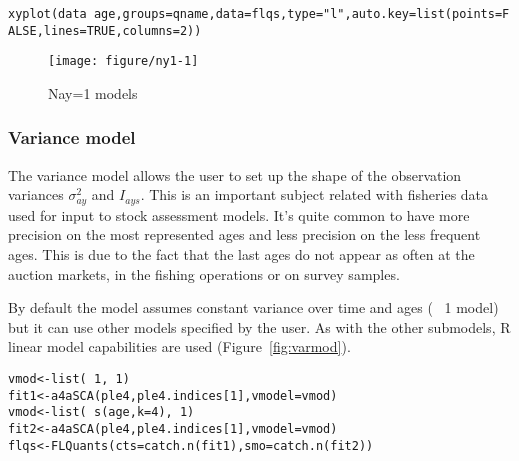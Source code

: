 \documentclass[a4paper,english,10pt]{article}\usepackage[]{graphicx}\usepackage[]{color}
\makeatletter
\def\maxwidth{ %
  \ifdim\Gin@nat@width>\linewidth
    \linewidth
  \else
    \Gin@nat@width
  \fi
}
\newcommand{\hlnum}[1]{\textcolor[rgb]{0.2,0.2,0.2}{#1}}%
\newcommand{\hlstr}[1]{\textcolor[rgb]{0.2,0.2,0.2}{#1}}%
\newcommand{\hlopt}[1]{\textcolor[rgb]{0.2,0.2,0.2}{#1}}%
\newcommand{\hlstd}[1]{\textcolor[rgb]{0,0,0}{#1}}%
\newcommand{\hlkwb}[1]{\textcolor[rgb]{0.361,0.506,0.596}{#1}}%
\newcommand{\hlkwc}[1]{\textcolor[rgb]{0.361,0.506,0.596}{#1}}%
\newcommand{\hlkwd}[1]{\textcolor[rgb]{0.361,0.506,0.596}{#1}}%
\newenvironment{kframe}{%
 \def\at@end@of@kframe{}%
 \ifinner\ifhmode%
  \def\at@end@of@kframe{\end{minipage}}%
  \begin{minipage}{\columnwidth}%
 \fi\fi%
 \def\FrameCommand##1{\hskip\@totalleftmargin \hskip-\fboxsep
 \colorbox{shadecolor}{##1}\hskip-\fboxsep
     \hskip-\linewidth \hskip-\@totalleftmargin \hskip\columnwidth}%
 \MakeFramed {\advance\hsize-\width
   \@totalleftmargin\z@ \linewidth\hsize
   \@setminipage}}%
 {\par\unskip\endMakeFramed%
 \at@end@of@kframe}
\newenvironment{knitrout}{}{} %
\makeatother
\begin{document}
\begin{knitrout}
\color{fgcolor}\begin{kframe}
\begin{alltt}
\hlkwd{xyplot}\hlstd{(data}\hlopt{~}\hlstd{age,} \hlkwc{groups}\hlstd{=qname,} \hlkwc{data}\hlstd{=flqs,} \hlkwc{type}\hlstd{=}\hlstr{"l"}\hlstd{,} \hlkwc{auto.key}\hlstd{=}\hlkwd{list}\hlstd{(}\hlkwc{points}\hlstd{=}\hlnum{FALSE}\hlstd{,} \hlkwc{lines}\hlstd{=}\hlnum{TRUE}\hlstd{,} \hlkwc{columns}\hlstd{=}\hlnum{2}\hlstd{))}
\end{alltt}
\end{kframe}\begin{figure}[H]

{\centering \texttt{[image: figure/ny1-1]} 

}

\caption[Nay=1 models]{Nay=1 models\label{fig:ny1}}
\end{figure}


\end{knitrout}

\subsubsection{Variance model}

The variance model allows the user to set up the shape of the observation variances $\sigma^2_{ay}$ and $I_{ays}$. This is an important subject related with fisheries data used for input to stock assessment models. It's quite common to have more precision on the most represented ages and less precision on the less frequent ages. This is due to the fact that the last ages do not appear as often at the auction markets, in the fishing operations or on survey samples.

By default the model assumes constant variance over time and ages (~ 1 model) but it can use other models specified by the user. As with the other submodels, R linear model capabilities are used (Figure~\ref{fig:varmod}).

\begin{knitrout}
\color{fgcolor}\begin{kframe}
\begin{alltt}
\hlstd{vmod} \hlkwb{<-} \hlkwd{list}\hlstd{(}\hlopt{~}\hlnum{1}\hlstd{,} \hlopt{~}\hlnum{1}\hlstd{)}
\hlstd{fit1} \hlkwb{<-} \hlkwd{a4aSCA}\hlstd{(ple4, ple4.indices[}\hlnum{1}\hlstd{],} \hlkwc{vmodel}\hlstd{=vmod)}
\hlstd{vmod} \hlkwb{<-} \hlkwd{list}\hlstd{(}\hlopt{~} \hlkwd{s}\hlstd{(age,} \hlkwc{k}\hlstd{=}\hlnum{4}\hlstd{),} \hlopt{~}\hlnum{1}\hlstd{)}
\hlstd{fit2} \hlkwb{<-} \hlkwd{a4aSCA}\hlstd{(ple4, ple4.indices[}\hlnum{1}\hlstd{],} \hlkwc{vmodel}\hlstd{=vmod)}
\hlstd{flqs} \hlkwb{<-} \hlkwd{FLQuants}\hlstd{(}\hlkwc{cts}\hlstd{=}\hlkwd{catch.n}\hlstd{(fit1),} \hlkwc{smo}\hlstd{=}\hlkwd{catch.n}\hlstd{(fit2))}
\end{alltt}
\end{kframe}
\end{knitrout}
\end{document}
